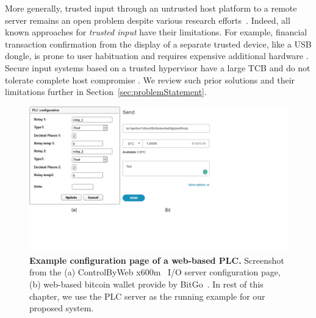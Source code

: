 More generally, trusted input through an untrusted host platform to a remote server remains an open problem despite various research efforts~\cite{sgxio,utp,x86,wimpyKernel,gyrus,weigold2011}. Indeed, all known approaches for \emph{trusted input} have their limitations. For example, financial transaction confirmation from the display of a separate trusted device, like a USB dongle, is prone to user habituation and requires expensive additional hardware \cite{weigold2011}. Secure input systems based on a trusted hypervisor have a large TCB and do not tolerate complete host compromise \cite{sgxio}. We review such prior solutions and their limitations further in Section~\ref{sec:problemStatement}.



\begin{figure}[t]
  \centering
    \includegraphics[trim={0 4cm 10cm 0},clip,width=\linewidth]{chapters/IntegriKey/images/config_pages.pdf}
    \caption[Example configuration page of a web-based PLC]{\textbf{Example configuration page of a web-based PLC.} Screenshot from the (a) ControlByWeb x600m~\cite{controlbyweb} I/O server configuration page, (b) web-based bitcoin wallet provide by BitGo~\cite{bitgo}. In rest of this chapter, we use the PLC server as the running example for our proposed system.}

    \label{fig:PLC}
\end{figure}


